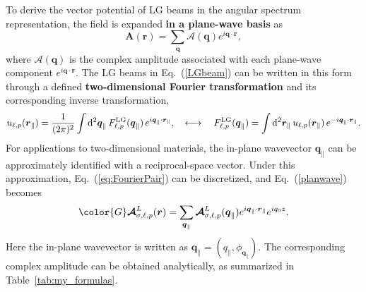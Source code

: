 To derive the vector potential of LG beams in the angular spectrum representation, the field is expanded \textbf{in a plane-wave basis} as
\begin{equation}
\boldsymbol{A}(\boldsymbol{r}) = \sum_{\boldsymbol{q}} \boldsymbol{\mathcal{A}}(\boldsymbol{q}) e^{i \boldsymbol{q} \cdot \boldsymbol{r}}, 
\label{planwave}
\end{equation}
where $\boldsymbol{\mathcal{A}}(\boldsymbol{q})$ is the complex amplitude associated with each plane-wave component $e^{i\boldsymbol{q}\cdot\boldsymbol{r}}$. The LG beams in Eq.~(\ref{LGbeam}) can be written in this form through a defined \textbf{two-dimensional Fourier transformation} and its corresponding inverse transformation,
\begin{equation}
u_{\ell, p}(\boldsymbol{r}_\parallel) = \frac{1}{(2\pi)^2} \int {\rm d}^2 \boldsymbol{q}_\parallel\, 
F^{\rm LG}_{\ell, p}(\boldsymbol{q}_\parallel)\, e^{i\boldsymbol{q}_\parallel\cdot \boldsymbol{r}_\parallel},
\quad \longleftrightarrow \quad
F^{\rm LG}_{\ell, p}(\boldsymbol{q}_\parallel) = \int {\rm d}^2 \boldsymbol{r}_\parallel\, 
u_{\ell, p}(\boldsymbol{r}_\parallel)\, e^{-i \boldsymbol{q}_\parallel\cdot \boldsymbol{r}_\parallel}.
\label{eq:FourierPair}
\end{equation}
For applications to two-dimensional materials, the in-plane wavevector $\boldsymbol{q}_\parallel$ can be approximately identified with a reciprocal-space vector. Under this approximation, Eq.~(\ref{eq:FourierPair}) can be discretized, and Eq.~(\ref{planwave}) becomes
\begin{equation} 
\color{G}
\boldsymbol{\mathcal{A}}^{L}_{\sigma, \ell, p}(\boldsymbol{r})
=
\sum_{\boldsymbol{q}_\parallel}
\boldsymbol{\mathcal{A}}^L_{\sigma, \ell, p}(\boldsymbol{q}_\parallel)
e^{i\boldsymbol{q}_\parallel\cdot \boldsymbol{r}_\parallel}
e^{i q_0 z}.
\end{equation}
Here the in-plane wavevector is written as $\boldsymbol{q}_\parallel=(q_\parallel,\phi_{\boldsymbol{q}_\parallel})$. The corresponding complex amplitude can be obtained analytically, as summarized in Table~\ref{tab:my_formulas}.
